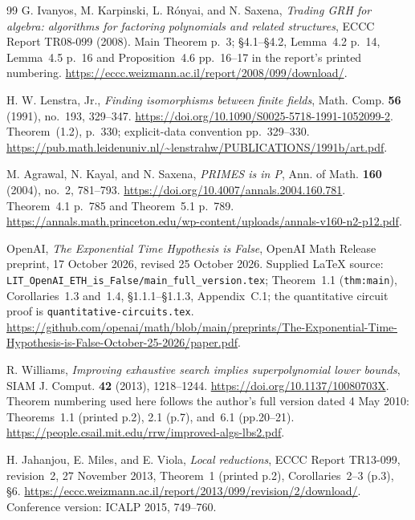 \documentclass[11pt,a4paper]{article}
\begin{document}
\begin{thebibliography}{99}
G. Ivanyos, M. Karpinski, L. R\'onyai, and N. Saxena,
\emph{Trading GRH for algebra: algorithms for factoring polynomials and related structures},
ECCC Report TR08-099 (2008).
Main Theorem p.~3; \S4.1--\S4.2, Lemma~4.2 p.~14,
Lemma~4.5 p.~16 and Proposition~4.6 pp.~16--17
in the report's printed numbering.
\url{https://eccc.weizmann.ac.il/report/2008/099/download/}.



H. W. Lenstra, Jr., \emph{Finding isomorphisms between finite fields},
Math. Comp. \textbf{56} (1991), no.~193, 329--347.
\url{https://doi.org/10.1090/S0025-5718-1991-1052099-2}.
Theorem~(1.2), p.~330; explicit-data convention pp.~329--330.
\url{https://pub.math.leidenuniv.nl/~lenstrahw/PUBLICATIONS/1991b/art.pdf}.



M. Agrawal, N. Kayal, and N. Saxena, \emph{PRIMES is in P},
Ann. of Math. \textbf{160} (2004), no.~2, 781--793.
\url{https://doi.org/10.4007/annals.2004.160.781}.
Theorem~4.1 p.~785 and Theorem~5.1 p.~789.
\url{https://annals.math.princeton.edu/wp-content/uploads/annals-v160-n2-p12.pdf}.


OpenAI, \emph{The Exponential Time Hypothesis is False},
OpenAI Math Release preprint, 17 October 2026, revised 25 October 2026.
Supplied LaTeX source:
\texttt{LIT\_OpenAI\_ETH\_is\_False/main\_full\_version.tex};
Theorem~1.1 (\texttt{thm:main}), Corollaries~1.3 and~1.4,
\S1.1.1--\S1.1.3, Appendix~C.1; the quantitative circuit proof is
\texttt{quantitative-circuits.tex}.
\url{https://github.com/openai/math/blob/main/preprints/The-Exponential-Time-Hypothesis-is-False-October-25-2026/paper.pdf}.



R. Williams, \emph{Improving exhaustive search implies superpolynomial
lower bounds}, SIAM J. Comput. \textbf{42} (2013), 1218--1244.
\url{https://doi.org/10.1137/10080703X}.
Theorem numbering used here follows the author's full version dated
4 May 2010: Theorems~1.1 (printed p.2), 2.1 (p.7), and~6.1
(pp.20--21).
\url{https://people.csail.mit.edu/rrw/improved-algs-lbs2.pdf}.



H. Jahanjou, E. Miles, and E. Viola, \emph{Local reductions},
ECCC Report TR13-099, revision~2, 27 November 2013,
Theorem~1 (printed p.2), Corollaries~2--3 (p.3), \S6.
\url{https://eccc.weizmann.ac.il/report/2013/099/revision/2/download/}.
Conference version: ICALP 2015, 749--760.




\end{thebibliography}
\end{document}
